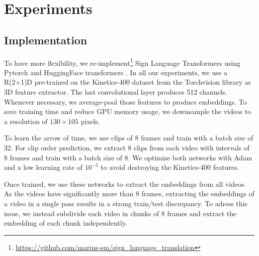 \documentclass[final]{cvpr}
\begin{document}
\section{Experiments}
\subsection{Implementation}

To have more flexibility, we re-implement\footnote{\url{https://github.com/marius-sm/sign_language_translation}} Sign Language Transformers \cite{neccam} using Pytorch and HuggingFace transformers \cite{huggingface}. In all our experiments, we use a R(2+1)D \cite{r2plus1} pre-trained on the Kinetics-400 \cite{kinetics} dataset from the Torchvision library as 3D feature extractor. The last convolutional layer produces 512 channels. Whenever necessary, we average-pool those features to produce embeddings. To save training time and reduce GPU memory usage, we downsample the videos to a resolution of $130\times105$ pixels.

To learn the arrow of time, we use clips of 8 frames and train with a batch size of 32. For clip order prediction, we extract 8 clips from each video with intervals of 8 frames and train with a batch size of 8. We optimize both networks with Adam and a low learning rate of $10^{-5}$ to avoid destroying the Kinetics-400 features.

Once trained, we use these networks to extract the embeddings from all videos. As the videos have significantly more than 8 frames,  extracting the embeddings of a video in a single pass results in a strong train/test discrepancy. To adress this issue, we instead subdivide each video in chunks of 8 frames and extract the embedding of each chunk independently.
\end{document}
